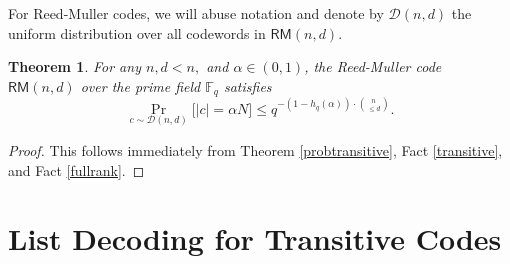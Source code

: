 \documentclass[12pt]{article}
\newtheorem{theorem}{Theorem}
\newcommand{\F}{\mathbb{F}}
\begin{document}
For Reed-Muller codes, we will abuse notation and denote by $\mathcal{D}(n,d)$ the uniform distribution over all codewords in $\mathsf{RM}(n,d)$.
\begin{theorem}\label{rmupperprob}
For any $n,d<n,$ and $\alpha\in (0,1)$, the Reed-Muller code $\mathsf{RM}(n,d)$ over the prime field $\F_q$ satisfies
 $$ \Pr_{c\sim\mathcal{D}(n,d)}\Big[|c| = \alpha N\Big] \leq q^{-(1-h_q(\alpha))\cdot \binom{n}{\leq d}}.$$
\end{theorem}
\begin{proof}
This follows immediately from Theorem \ref{probtransitive}, Fact \ref{transitive}, and Fact \ref{fullrank}.
\end{proof}



\section{List Decoding for Transitive Codes}\label{listtransitive}
\end{document}
